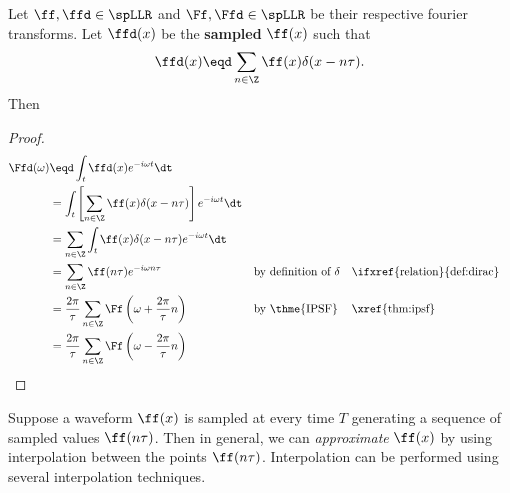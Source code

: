 \begin{theorem}
\label{thm:f_sampling}
Let $\ff,\ffd\in\spLLR$ and $\Ff,\Ffd\in\spLLR$ 
be their respective fourier transforms.
Let $\ffd(x)$ be the {\bf sampled} $\ff(x)$ such that
  \[ \ffd(x) \eqd \sum_{n\in\Z} \ff(x) \delta(x-n\tau). \]
Then
\end{theorem}
\begin{proof}
\begin{align*}
   \Ffd(\omega) 
     &\eqd \int_t \ffd(x) e^{-i\omega t} \dt
   \\&=    \int_t \left[\sum_{n\in\Z} \ff(x) \delta(x-n\tau)\right] e^{-i\omega t} \dt
   \\&=    \sum_{n\in\Z} \int_t \ff(x) \delta(x-n\tau) e^{-i\omega t} \dt
   \\&=    \sum_{n\in\Z} \ff(n\tau) e^{-i\omega n\tau}
     &&    \text{by definition of $\delta$}
     &&    \text{\ifxref{relation}{def:dirac}}
   \\&=    \frac{2\pi}{\tau} \sum_{n\in\Z} \Ff\left(\omega + \frac{2\pi}{\tau}n \right)
     &&    \text{by \thme{IPSF}}
     &&    \text{\xref{thm:ipsf}}
   \\&=    \frac{2\pi}{\tau} \sum_{n\in\Z} \Ff\left(\omega-\frac{2\pi}{\tau}n\right)
\end{align*}
\end{proof}

Suppose a waveform $\ff(x)$ is sampled at every time $T$
generating a sequence of sampled values $\ff(n\tau)$.
Then in general, we can {\em approximate} $\ff(x)$ by 
using interpolation between the points $\ff(n\tau)$.
Interpolation can be performed using several interpolation techniques. %

